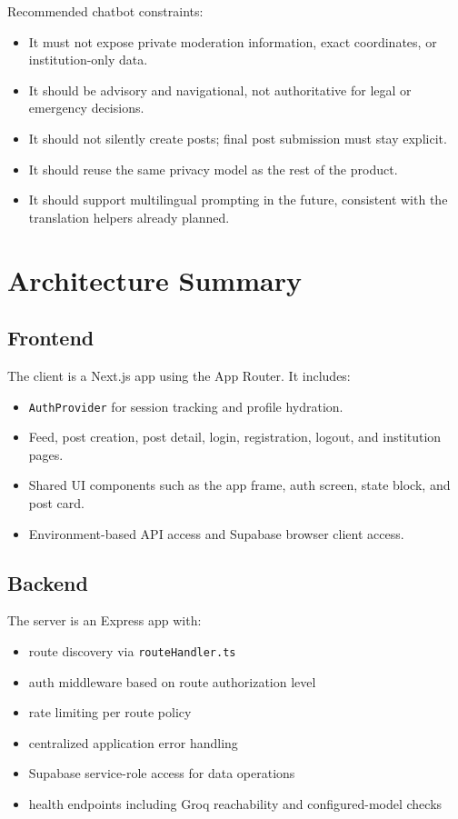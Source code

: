\documentclass[11pt,a4paper]{article}
\begin{document}
Recommended chatbot constraints:
\begin{itemize}
  \item It must not expose private moderation information, exact coordinates, or institution-only data.
  \item It should be advisory and navigational, not authoritative for legal or emergency decisions.
  \item It should not silently create posts; final post submission must stay explicit.
  \item It should reuse the same privacy model as the rest of the product.
  \item It should support multilingual prompting in the future, consistent with the translation helpers already planned.
\end{itemize}

\section{Architecture Summary}
\subsection{Frontend}
The client is a Next.js app using the App Router. It includes:
\begin{itemize}
  \item \texttt{AuthProvider} for session tracking and profile hydration.
  \item Feed, post creation, post detail, login, registration, logout, and institution pages.
  \item Shared UI components such as the app frame, auth screen, state block, and post card.
  \item Environment-based API access and Supabase browser client access.
\end{itemize}

\subsection{Backend}
The server is an Express app with:
\begin{itemize}
  \item route discovery via \texttt{routeHandler.ts}
  \item auth middleware based on route authorization level
  \item rate limiting per route policy
  \item centralized application error handling
  \item Supabase service-role access for data operations
  \item health endpoints including Groq reachability and configured-model checks
\end{itemize}
\end{document}
